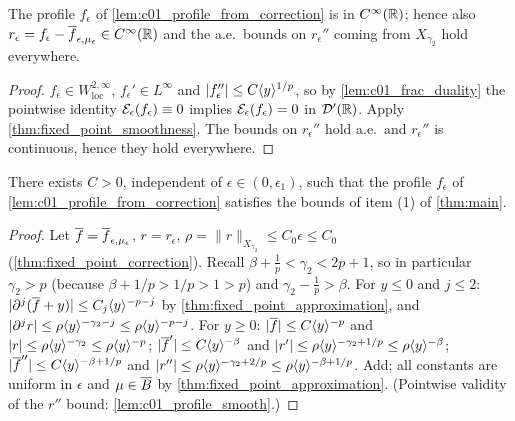 \begin{lemma}
  \label{lem:c01_profile_smooth}
  The profile $f_\epsilon$ of \cref{lem:c01_profile_from_correction} is in $C^\infty(\mathbb{R})$; hence
  also $r_\epsilon=f_\epsilon-\overline{f}_{\epsilon,\mu_\epsilon}\in C^\infty(\mathbb{R})$ and the a.e.\ bounds on
  $r_\epsilon''$ coming from $X_{\gamma_2}$ hold everywhere.
\end{lemma}
\begin{proof}
  $f_\epsilon\in W^{2,\infty}_{\mathrm{loc}}$, $f_\epsilon'\in L^\infty$ and $|f_\epsilon''|\le C\langle y \rangle^{1/p}$,
  so by \cref{lem:c01_frac_duality} the pointwise identity $\mathcal{E}_\epsilon(f_\epsilon)\equiv0$ implies
  $\mathcal{E}_\epsilon(f_\epsilon)=0$ in $\mathcal D'(\mathbb{R})$.  Apply \cref{thm:fixed_point_smoothness}.
  The bounds on $r_\epsilon''$ hold a.e.\ and $r_\epsilon''$ is continuous, hence they hold everywhere.
\end{proof}

\begin{lemma}
  \label{lem:c01_profile_bounds}
  There exists $C>0$, independent of $\epsilon\in(0,\epsilon_1)$, such that the profile $f_\epsilon$
  of \cref{lem:c01_profile_from_correction} satisfies the bounds of item (1) of \cref{thm:main}.
\end{lemma}
\begin{proof}
  Let $\overline{f}=\overline{f}_{\epsilon,\mu_\epsilon}$, $r=r_\epsilon$, $\rho=\|r\|_{X_{\gamma_2}}\le C_0\epsilon\le C_0$
  (\cref{thm:fixed_point_correction}).  Recall $\beta+\frac1p<\gamma_2<2p+1$, so in particular
  $\gamma_2>p$ (because $\beta+1/p>1/p>1>p$) and $\gamma_2-\frac1p>\beta$.
  For $y\le0$ and $j\le2$: $|\partial^j(\overline{f}+y)|\le C_j\langle y \rangle^{-p-j}$ by
  \cref{thm:fixed_point_approximation}, and $|\partial^jr|\le\rho\langle y \rangle^{-\gamma_2-j}\le\rho\langle y \rangle^{-p-j}$.
  For $y\ge0$: $|\overline{f}|\le C\langle y \rangle^{-p}$ and $|r|\le\rho\langle y \rangle^{-\gamma_2}\le\rho\langle y \rangle^{-p}$;
  $|\overline{f}'|\le C\langle y \rangle^{-\beta}$ and $|r'|\le\rho\langle y \rangle^{-\gamma_2+1/p}\le\rho\langle y \rangle^{-\beta}$;
  $|\overline{f}''|\le C\langle y \rangle^{-\beta+1/p}$ and $|r''|\le\rho\langle y \rangle^{-\gamma_2+2/p}\le\rho\langle y \rangle^{-\beta+1/p}$.
  Add; all constants are uniform in $\epsilon$ and $\mu\in\overline{B}$ by
  \cref{thm:fixed_point_approximation}.  (Pointwise validity of the $r''$ bound:
  \cref{lem:c01_profile_smooth}.)
\end{proof}

